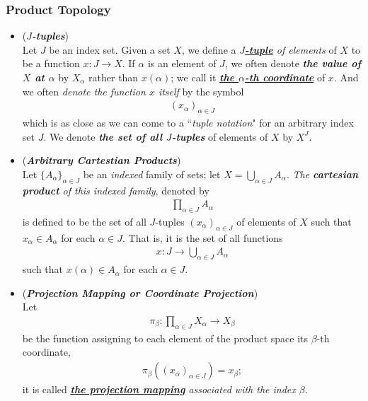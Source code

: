 \documentclass[11pt]{article}
\begin{document}
\subsubsection{Product Topology}
\begin{itemize}
\item \begin{definition} (\emph{\textbf{$J$-tuples}})\\
Let $J$ be an index set. Given a set $X$, we define a \emph{\underline{\textbf{$J$-tuple}} of elements} of $X$ to be a function $x : J \rightarrow X$. If $\alpha$ is an element of $J$, we often denote \emph{\textbf{the value of $X$ at $\alpha$}} by $X_{\alpha}$ rather than $x(\alpha)$; we call it \underline{\emph{\textbf{the $\alpha$-th coordinate}}} of $x$. And we often \emph{denote the function $x$ itself} by the symbol
\begin{align*}
(x_{\alpha})_{\alpha \in J}
\end{align*}
which is as close as we can come to a ``\emph{tuple notation}" for an arbitrary index set $J$. We denote \emph{\textbf{the set of all $J$-tuples}} of elements of $X$ by $X^{J}$.
\end{definition}

\item \begin{definition} (\emph{\textbf{Arbitrary Cartestian Products}})\\
Let $\{A_{\alpha}\}_{\alpha \in J}$ be an \emph{indexed} family of sets; let $X = \bigcup_{\alpha \in J}A_{\alpha}$. \emph{The \textbf{cartesian product} of this indexed family}, denoted by
\begin{align*}
\prod_{\alpha \in J} A_{\alpha}
\end{align*}
is defined to be the set of all $J$-tuples $(x_{\alpha})_{\alpha \in J}$ of elements of $X$ such that $x_{\alpha} \in A_{\alpha}$ for each $\alpha \in J$. That is, it is the set of all functions
\begin{align*}
x: J \rightarrow \bigcup_{\alpha \in J}A_{\alpha}
\end{align*}
such that $x(\alpha) \in A_{\alpha}$ for each $\alpha \in J$.
\end{definition}

\item \begin{definition} (\emph{\textbf{Projection Mapping or Coordinate Projection}})\\
Let
\begin{align*}
\pi_{\beta}: \prod_{\alpha \in J} X_{\alpha} \rightarrow X_{\beta}
\end{align*}
be the function assigning to each element of the product space its $\beta$-th coordinate,
\begin{align*}
\pi_{\beta}((x_{\alpha})_{\alpha \in J}) = x_{\beta};
\end{align*}
it is called \emph{\underline{\textbf{the projection mapping}} associated with the index $\beta$}.
\end{definition}


\end{itemize}
\end{document}
